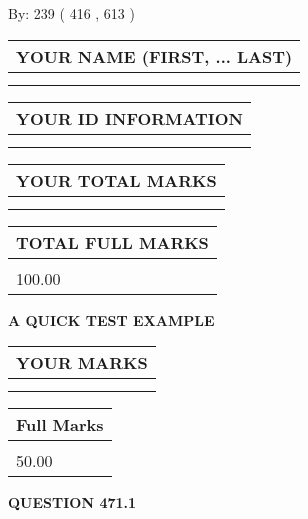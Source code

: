 \documentclass[12pt]{article}
\begin{document}
   
\hspace{1.0in} By: 
 239 ( 416 ,  613 )
   
   
   
   
\newpage 
\setcounter{page}{ 
   471001 } 
   
   
   
   
\noindent\begin{tabular}{|l|}
\hline
YOUR NAME (FIRST, ... LAST)  \\
\hline
 \\ 
 \\ 
\hline
\end{tabular}
\hspace{0.05in} \begin{tabular}{|l|}
\hline
 YOUR   ID   INFORMATION  \\
\hline
 \\ 
 \\ 
\hline
\end{tabular}
   
   
\vspace{0.2in}\noindent\begin{tabular}{|l|}
\hline
YOUR TOTAL MARKS  \\
\hline
 \\ 
 \\ 
\hline
\end{tabular}
\hspace{0.05in} \begin{tabular}{|l|}
\hline
TOTAL FULL MARKS  \\
\hline
 \\ 
100.00 \\
\hline
\end{tabular}
   
   
 \vspace{0.2in}
{\LARGE {\textbf{ A QUICK TEST EXAMPLE}}}
   
   
  
\vspace{0.2in}
  
\noindent\begin{tabular}{|l|}
\hline
 YOUR MARKS  \\
\hline
 \\ 
 \\ 
\hline
\end{tabular}
\hspace{0.05in} \begin{tabular}{|l|}
\hline
 Full Marks  \\
\hline
 \\ 
50.00 \\
\hline
\end{tabular}
{\textbf{\Large{QUESTION
471.1 
}}}
  
\end{document}
